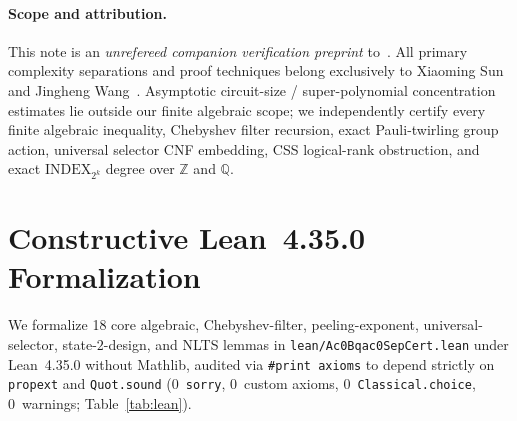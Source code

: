 \documentclass[10pt,twocolumn]{article}
\begin{document}
\paragraph{Scope and attribution.}
This note is an \emph{unrefereed companion verification preprint} to~\cite{SunWang2026AC0BQAC0}. All primary complexity separations and proof techniques belong exclusively to Xiaoming Sun and Jingheng Wang~\cite{SunWang2026AC0BQAC0}. Asymptotic circuit-size / super-polynomial concentration estimates lie outside our finite algebraic scope; we independently certify every finite algebraic inequality, Chebyshev filter recursion, exact Pauli-twirling group action, universal selector CNF embedding, CSS logical-rank obstruction, and exact $\mathrm{INDEX}_{2^k}$ degree over $\mathbb{Z}$ and $\mathbb{Q}$.

\section{Constructive Lean~4.35.0 Formalization}
We formalize 18 core algebraic, Chebyshev-filter, peeling-exponent, universal-selector, state-$2$-design, and NLTS lemmas in \texttt{lean/\allowbreak Ac0Bqac0SepCert.lean} under Lean~4.35.0 without Mathlib, audited via \texttt{\#print axioms} to depend strictly on \texttt{propext} and \texttt{Quot.sound} (0~\texttt{sorry}, 0~custom axioms, 0~\texttt{Classical.choice}, 0~warnings; Table~\ref{tab:lean}).
\end{document}
